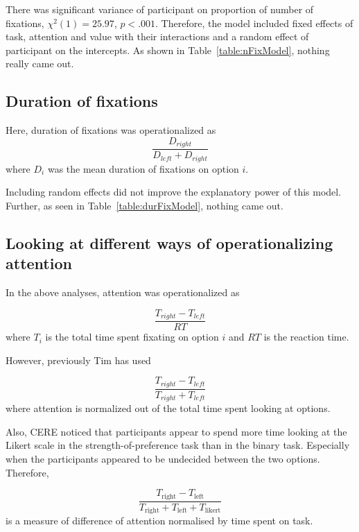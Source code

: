 \documentclass[12pt]{article}
\begin{document}
There was significant variance of participant on proportion of number of fixations, $\chi^2(1)=25.97$, $p<.001$. Therefore, the model included fixed effects of task, attention and value with their interactions and a random effect of participant on the intercepts. As shown in Table~\ref{table:nFixModel}, nothing really came out. 





\clearpage
\subsection{Duration of fixations}
Here, duration of fixations was operationalized as 
\begin{equation}
	\frac{D_{right}}{D_{left} + D_{right}}
\end{equation}
where $D_i$ was the mean duration of fixations on option $i$. 

Including random effects did not improve the explanatory power of this model. Further, as seen in Table~\ref{table:durFixModel}, nothing came out. 



\clearpage
\newpage
\subsection{Looking at different ways of operationalizing attention}
In the above analyses, attention was operationalized as 

\begin{equation}
	\frac{T_{right}-T_{left}}{RT}	
\end{equation}
where $T_i$ is the total time spent fixating on option $i$ and $RT$ is the reaction time. 

However, previously Tim has used

\begin{equation}
	\frac{T_{right}-T_{left}}{T_{right}+T_{left}}
\end{equation}
where attention is normalized out of the total time spent looking at options. 

Also, CERE noticed that participants appear to spend more time looking at the Likert scale in the strength-of-preference task than in the binary task. Especially when the participants appeared to be undecided between the two options. Therefore, 

\begin{equation}
	\frac{T_\text{right}-T_\text{left}}{T_\text{right}+T_\text{left}+T_\text{likert}}
\end{equation}
is a measure of difference of attention normalised by time spent on task. 

\end{document}
